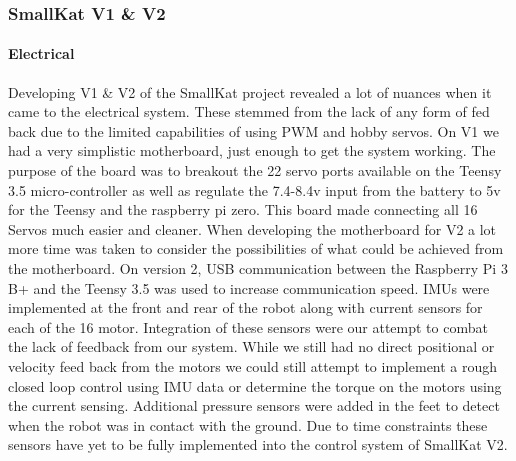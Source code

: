     \subsubsection{SmallKat V1 \& V2}
        \paragraph{Electrical}
        Developing V1 \& V2 of the SmallKat project revealed a lot of nuances when it came to the electrical system. These stemmed from the lack of any form of fed back due to the limited capabilities of using PWM and hobby servos. On V1 we had a very simplistic motherboard, just enough to get the system working. The purpose of the board was to breakout the 22 servo ports available on the Teensy 3.5 micro-controller as well as regulate the 7.4-8.4v input from the battery to 5v for the Teensy and the raspberry pi zero. This board made connecting all 16 Servos much easier and cleaner. When developing the motherboard for V2 a lot more time was taken to consider the possibilities of what could be achieved from the motherboard. On version 2, USB communication between the Raspberry Pi 3 B+ and the Teensy 3.5 was used to increase communication speed. IMUs were implemented at the front and rear of the robot along with current sensors for each of the 16 motor. Integration of these sensors were our attempt to combat the lack of feedback from our system. While we still had no direct positional or velocity feed back from the motors we could still attempt to implement a rough closed loop control using IMU data or determine the torque on the motors using the current sensing. Additional pressure sensors were added in the feet to detect when the robot was in contact with the ground. Due to time constraints these sensors have yet to be fully implemented into the control system of SmallKat V2.
        
